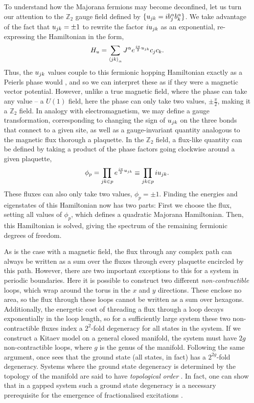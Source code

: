 To understand how the Majorana fermions may become deconfined, let us turn our attention to the $\mathbb Z_2$ gauge field defined by $\{u_{jk} = ib^\alpha_jb^\alpha_k\}$. We take advantage of the fact that $u_{jk} = \pm 1$ to rewrite the factor $iu_{jk}$ as an exponential, re-expressing the Hamiltonian in the form,
\begin{align}
    H_u = \sum_{\braket{jk}_\alpha} J^\alpha e^{\frac{i\pi}{2} u_{jk} } c_j c_k.
\end{align}
Thus, the $u_{jk}$ values couple to this fermionic hopping Hamiltonian exactly as a Peierls phase would \cite{peierls_zur_1933}, and so we can interpret these as if they were a magnetic vector potential. However, unlike a true magnetic field, where the phase can take any value -- a $U(1)$ field, here the phase can only take two values, $\pm \frac \pi 2$, making it a $\mathbb Z_2$ field. In analogy with electromagnetism, we may define a gauge transformation, corresponding to changing the sign of $u_{jk}$ on the three bonds that connect to a given site, as well as a gauge-invariant quantity analogous to the magnetic flux thorough a plaquette. In the $\mathbb Z_2$ field, a flux-like quantity can be defined by taking a product of the phase factors going clockwise around a given plaquette,
\begin{align}
    \phi_p = \prod_{jk \in p} e^{\frac{i\pi}{2} u_{jk} } \equiv \prod_{jk \in p} i u_{jk}.
\end{align}
These fluxes can also only take two values, $\phi_p = \pm 1$. Finding the energies and eigenstates of this Hamiltonian now has two parts: First we choose the flux, setting all values of $\phi_p$, which defines a quadratic Majorana Hamiltonian. Then, this Hamiltonian is solved, giving the spectrum of the remaining fermionic degrees of freedom. 

As is the case with a magnetic field, the flux through any complex path can always be written as a sum over the fluxes through every plaquette encircled by this path. However, there are two important exceptions to this for a system in periodic boundaries. Here it is possible to construct two different \emph{non-contractible} loops, which wrap around the torus in the $x$ and $y$ directions. These enclose no area, so the flux through these loops cannot be written as a sum over hexagons. Additionally, the energetic cost of threading a flux through a loop decays exponentially in the loop length, so for a sufficiently large system these two non-contractible fluxes index a $2^{2}$-fold degeneracy for all states in the system. If we construct a Kitaev model on a general closed manifold, the system must have $2g$ non-contractible loops, where $g$ is the genus of the manifold. Following the same argument, once sees that the ground state (all states, in fact) has a $2^{2g}$-fold degeneracy. Systems where the ground state degeneracy is determined by the topology of the manifold are said to have \emph{topological order} \cite{wen_mean_1991,wen_quantum_2007}. In fact, one can show that in a gapped system such a ground state degeneracy is a necessary prerequisite for the emergence of fractionalised excitations \cite{oshikawa_fractionalization_2006}.

